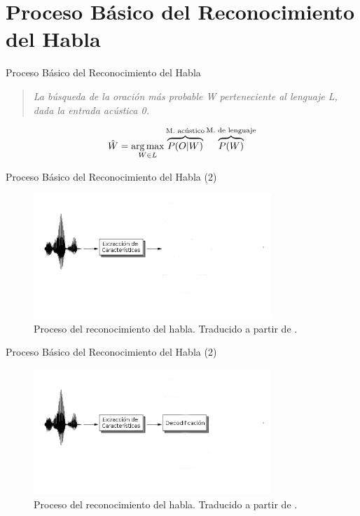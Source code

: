 \section{Proceso B\'asico del Reconocimiento del Habla}

\begin{frame}{Proceso B\'asico del Reconocimiento del Habla}

\begin{quote}
\emph{La b\'usqueda de la oraci\'on m\'as probable W perteneciente al lenguaje L, dada la entrada ac\'ustica 0.}
\end{quote}

\begin{align}
\hat{W} = \operatorname*{arg\,max}_{W \in L} \overbrace{P(O|W)}^\text{M. ac\'ustico}\overbrace{P(W)}^\text{M. de lenguaje}
\label{eq:asrFundamental}
\end{align}
\end{frame}

\begin{frame}{Proceso B\'asico del Reconocimiento del Habla (2)}

\begin{figure}[H] 
\centering
\includegraphics[width=0.8\textwidth]{./graphics/proceso_0.png}
\caption{Proceso del reconocimiento del habla. Traducido a partir de \protect\cite{VerenichASR}.}
\label{figure:proceso}
\end{figure}
\end{frame}

\begin{frame}{Proceso B\'asico del Reconocimiento del Habla (2)}

\begin{figure}[H] 
\centering
\includegraphics[width=0.8\textwidth]{./graphics/proceso_1.png}
\caption{Proceso del reconocimiento del habla. Traducido a partir de \protect\cite{VerenichASR}.}
\label{figure:proceso}
\end{figure}
\end{frame}

